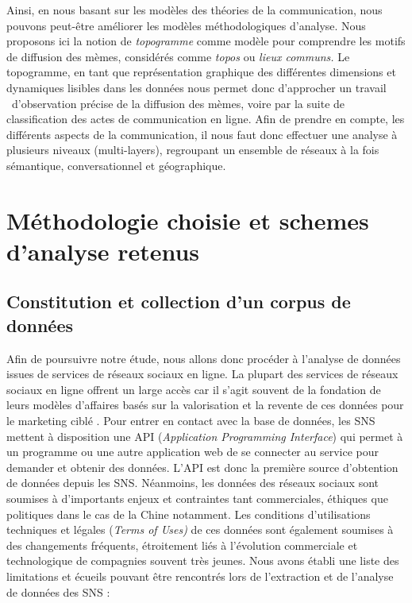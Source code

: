Ainsi, en nous basant sur les modèles des théories de la communication, nous pouvons peut-\^etre améliorer les modèles méthodologiques d{\textquoteright}analyse. Nous proposons ici la notion de \textit{topogramme }comme modèle pour comprendre les motifs de diffusion des mèmes, considérés comme \textit{topos} ou \textit{lieux communs. }Le topogramme, en tant que représentation graphique des différentes dimensions et dynamiques lisibles dans les données nous permet donc d{\textquoteright}approcher un travail \ d{\textquoteright}observation précise de la diffusion des mèmes, voire par la suite de classification des actes de communication en ligne. Afin de prendre en compte, les différents aspects de la communication, il nous faut donc effectuer une analyse à plusieurs niveaux (multi-layers), regroupant un ensemble de réseaux à la fois sémantique, conversationnel et géographique.


\section{Méthodologie choisie et schemes d{\textquoteright}analyse retenus}

\subsection[Constitution et collection d{\textquoteright}un corpus de données]{Constitution et collection d{\textquoteright}un corpus de données}

Afin de poursuivre notre étude, nous allons donc procéder à l{\textquoteright}analyse de données issues de services de réseaux sociaux en ligne. La plupart des services de réseaux sociaux en ligne offrent un large accès car il s{\textquoteright}agit souvent de la fondation de leurs modèles d{\textquoteright}affaires basés sur la valorisation et la revente de ces données pour le marketing ciblé \citep{Ko2010}. Pour entrer en contact avec la base de données, les SNS mettent à disposition une API (\textit{Application Programming Interface}) qui permet à un programme ou une autre application web de se connecter au service pour demander et obtenir des données. L{\textquoteright}API est donc la première source d{\textquoteright}obtention de données depuis les SNS. Néanmoins, les données des réseaux sociaux sont soumises à d{\textquoteright}importants enjeux et contraintes tant commerciales, éthiques que politiques dans le cas de la Chine notamment. Les conditions d{\textquoteright}utilisations techniques et légales (\textit{Terms of Uses) }de ces données sont également soumises à des changements fréquents, étroitement liés à l{\textquoteright}évolution commerciale et technologique de compagnies souvent très jeunes. Nous avons établi une liste des limitations et écueils pouvant \^etre rencontrés lors de l{\textquoteright}extraction et de l{\textquoteright}analyse de données des SNS :

